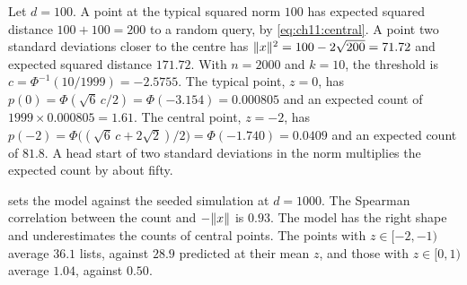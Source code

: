 \begin{example}\label{ex:ch11:central}
Let $d=100$. A point at the typical squared norm $100$ has expected squared distance $100+100=200$ to a random query, by \cref{eq:ch11:central}. A point two standard deviations closer to the centre has $\lVert x\rVert^2=100-2\sqrt{200}=71.72$ and expected squared distance $171.72$. With $n=2000$ and $k=10$, the threshold is $c=\Phi^{-1}(10/1999)=-2.5755$. The typical point, $z=0$, has $p(0)=\Phi(\sqrt6\,c/2)=\Phi(-3.154)=0.000805$ and an expected count of $1999\times0.000805=1.61$. The central point, $z=-2$, has $p(-2)=\Phi\big((\sqrt6\,c+2\sqrt2)/2\big)=\Phi(-1.740)=0.0409$ and an expected count of $81.8$. A head start of two standard deviations in the norm multiplies the expected count by about fifty.
\end{example}

 sets the model against the seeded simulation at $d=1000$. The Spearman correlation between the count and $-\lVert x\rVert$ is $0.93$. The model has the right shape and underestimates the counts of central points. The points with $z\in[-2,-1)$ average $36.1$ lists, against $28.9$ predicted at their mean $z$, and those with $z\in[0,1)$ average $1.04$, against $0.50$.

